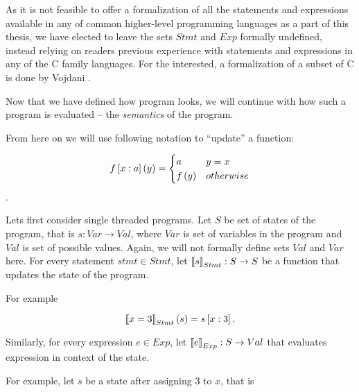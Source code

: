 \documentclass[..thesis.tex]{subfiles}
\begin{document}

As it is not feasible to offer a formalization of all the statements and expressions available in any of common higher-level programming languages as a part of this thesis, we have elected to leave the sets $Stmt$ and $Exp$ formally undefined, instead relying on readers previous experience with statements and expressions in any of the C family languages.   For the interested, a formalization of a subset of C is done by Vojdani .




Now that we have defined how program looks, we will continue with how such a program is evaluated -- the \textit{semantics} of the program.

From here on we will use following notation to ``update'' a function:

\begin{equation*}
f \left[ x : a \right] \left( y \right) = 
  \begin{cases}
  a & y = x \\
  f \left(  y \right) & otherwise \\ 
  \end{cases}
\end{equation*}.

Lets first consider single threaded programs. Let $S$ be set of states of the program, that is $s : Var \to Val$, where $Var$ is set of variables in the program and $Val$ is set of possible values. Again, we will not formally define sets $Val$ and $Var$ here. For every statement $stmt \in Stmt$, let $ \left\llbracket s \right\rrbracket_{Stmt} : S \to S$ be a function that updates the state of the program. 

For example

\begin{equation*}
 \left\llbracket x = 3 \right\rrbracket_{Stmt} (s) = s \left[ x : 3 \right] \text{.}
\end{equation*}

Similarly, for every expression $e \in Exp$, let $\left\llbracket e \right\rrbracket_{Exp} : S \to Val$ that evaluates expression in context of the state. 

For example, let $s$ be a state after assigning $3$ to $x$, that is
\end{document}
